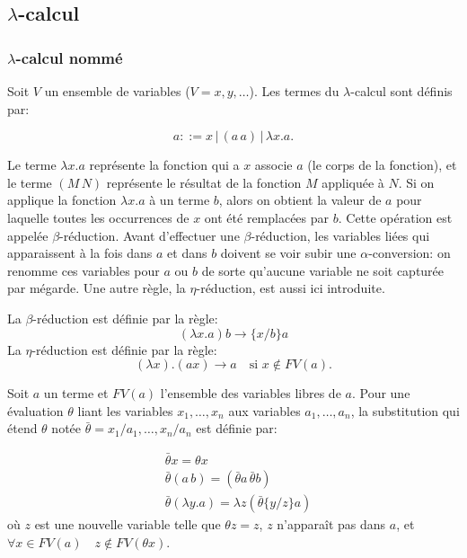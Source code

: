 \subsection{$\lambda$-calcul}

\subsubsection{$\lambda$-calcul nommé}

Soit $V$ un ensemble de variables ($V={x,y,\dots}$). Les termes du $\lambda$-calcul sont définis par:

\[ a ::= x \,|\, (a \, a) \,| \,\lambda x. a.\]

Le terme $\lambda x.a$ représente la fonction qui a $x$ associe $a$ (le corps de la fonction), et le terme $(M \, N)$ représente le résultat de la fonction $M$ appliquée à $N$. Si on applique la fonction $\lambda x.a$ à un terme $b$, alors on obtient la valeur de $a$ pour laquelle toutes les occurrences de $x$ ont été remplacées par $b$. Cette opération est appelée $\beta$-réduction. Avant d’effectuer une $\beta$-réduction, les variables liées qui apparaissent à la fois dans $a$ et dans $b$ doivent se voir subir une $\alpha$-conversion: on renomme ces variables pour $a$ ou $b$ de sorte qu'aucune variable ne soit capturée par mégarde. Une autre règle, la $\eta$-réduction, est aussi ici introduite.

\begin{defn}
La $\beta$-réduction est définie par la règle:
\[(\lambda x.a)b \xrightarrow{} \{x/b\}a\]
La $\eta$-réduction est définie par la règle:
\[(\lambda x).(a x) \xrightarrow{} a \quad \text{si } x \notin FV(a). \]
\end{defn}

\begin{defn}
Soit $a$ un terme et $FV(a)$ l’ensemble des variables libres de $a$. Pour une évaluation $\theta$ liant les variables $x_1,\dots,x_n$ aux variables $a_1,\dots,a_n$, la substitution qui étend $\theta$ notée $\bar{\theta}={x_1/a_1,\dots,x_n/a_n}$ est définie par:

\begin{align*}
&\bar{\theta}x = \theta x \\
&\bar{\theta}(a \, b) = (\bar{\theta}a \, \bar{\theta}b) \\
& \bar{\theta}(\lambda y.a) = \lambda z (\bar{\theta}\{y/z\}a) 
\end{align*}
où $z$ est une nouvelle variable telle que $\theta z = z$, $z$ n'apparaît pas dans $a$, et $\forall{x} \in FV(a) \quad z \notin FV(\theta x)$.
\end{defn}

